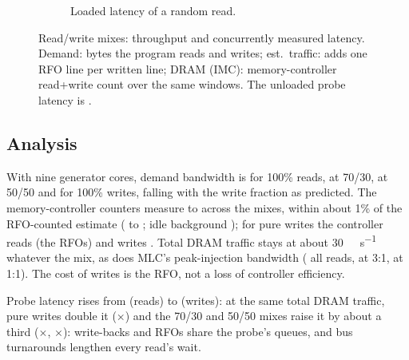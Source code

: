 \begin{figure}[tbp]
\begin{subfigure}[t]{0.49\linewidth}
{}
    \caption{Loaded latency of a random read.}
  \end{subfigure}
  \caption{Read/write mixes: throughput and concurrently measured latency. Demand: bytes the program reads
  and writes; est.\ traffic: adds one RFO line per written line; DRAM (IMC): memory-controller read+write
  count over the same windows. The unloaded probe latency
  is .}\label{fig:rw-mix}
\end{figure}

\subsection{Analysis}
With nine generator cores, demand bandwidth is  for 100\%
reads,  at 70/30, 
at 50/50 and  for 100\% writes, falling with the write fraction as
predicted. The memory-controller counters measure  to
 across the mixes, within about 1\% of the RFO-counted estimate
( to ; idle
background ); for pure writes the controller reads
 (the RFOs) and writes .
Total DRAM traffic stays at about \qty{30}{\gibi\byte\per\second} whatever the mix, as does MLC's
peak-injection bandwidth ( all reads,
 at 3:1,  at 1:1).
The cost of writes is the RFO, not a loss of controller efficiency.

Probe latency rises from  (reads) to 
(writes): at the same total DRAM traffic, pure writes double it ($\times$) and the 70/30 and 50/50 mixes raise it by about a third
($\times$, $\times$): write-backs and RFOs share the probe's queues,
and bus turnarounds lengthen every read's wait.

